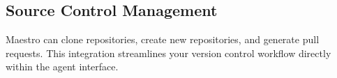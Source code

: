 \subsection*{Source Control Management}

Maestro can clone repositories, create new repositories, and generate pull requests. This integration streamlines your version control workflow directly within the agent interface.